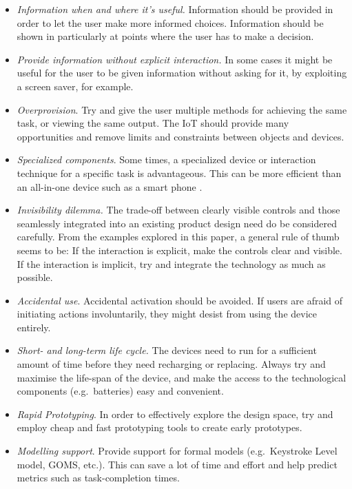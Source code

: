 \begin{itemize}
	\item \emph{Information when and where it's useful.} Information should be provided in order to let the user make more informed choices. Information should be shown in particularly at points where the user has to make a decision.
	\item \emph{Provide information without explicit interaction.} In some cases it might be useful for the user to be given information without asking for it, by exploiting a screen saver, for example.
	\item \emph{Overprovision}. Try and give the user multiple methods for achieving the same task, or viewing the same output. The IoT should provide many opportunities and remove limits and constraints between objects and devices.
	\item \emph{Specialized components}. Some times, a specialized device or interaction technique for a specific task is advantageous. This can be more efficient than an all-in-one device such as a smart phone \cite{corsten13,kranz10}.
	\item \emph{Invisibility dilemma.} The trade-off between clearly visible controls and those seamlessly integrated into an existing product design need do be considered carefully. From the examples explored in this paper, a general rule of thumb seems to be: If the interaction is explicit, make the controls clear and visible. If the interaction is implicit, try and integrate the technology as much as possible.
	\item \emph{Accidental use}. Accidental activation should be avoided. If users are afraid of initiating actions involuntarily, they might desist from using the device entirely.
	\item \emph{Short- and long-term life cycle.} The devices need to run for a sufficient amount of time before they need recharging or replacing. Always try and maximise the life-span of the device, and make the access to the technological components (e.g.\ batteries) easy and convenient.
	\item \emph{Rapid Prototyping}. In order to effectively explore the design space, try and employ cheap and fast prototyping tools to create early prototypes.
	\item \emph{Modelling support}. Provide support for formal models (e.g.\ Keystroke Level model, GOMS, etc.). This can save a lot of time and effort and help predict metrics such as task-completion times.
\end{itemize}

